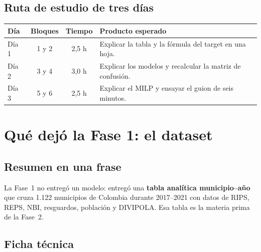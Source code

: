 \documentclass[11pt,a4paper]{article}
\begin{document}
\subsection{Ruta de estudio de tres días}

\begin{table}[H]
\centering
\small
\begin{tabularx}{\textwidth}{@{}l c c Y@{}}
\toprule
\textbf{Día} & \textbf{Bloques} & \textbf{Tiempo} & \textbf{Producto esperado} \\
\midrule
Día 1 & 1 y 2 & 2,5 h & Explicar la tabla y la fórmula del target en una hoja. \\
Día 2 & 3 y 4 & 3,0 h & Explicar los modelos y recalcular la matriz de confusión. \\
Día 3 & 5 y 6 & 2,5 h & Explicar el MILP y ensayar el guion de seis minutos. \\
\bottomrule
\end{tabularx}
\end{table}

\section{Qué dejó la Fase 1: el dataset}

\subsection{Resumen en una frase}

La Fase~1 no entregó un modelo: entregó una \textbf{tabla analítica municipio--año} que cruza 1.122 municipios de Colombia durante 2017--2021 con datos de RIPS, REPS, NBI, resguardos, población y DIVIPOLA. Esa tabla es la materia prima de la Fase~2.

\subsection{Ficha técnica}
\end{document}
